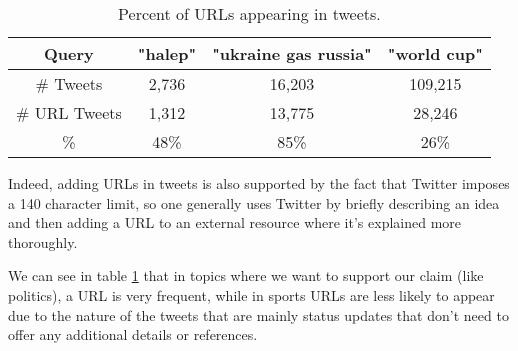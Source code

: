 \begin{table}[!h]
\centering
\setlength{\tabcolsep}{12pt}
\begin{tabular}{ | c | c | c| c | }
\hline
Query & "halep" & "ukraine gas russia" & "world cup"\\
\hline
\# Tweets & 2,736 & 16,203 & 109,215\\
\hline
\# URL Tweets & 1,312 & 13,775 & 28,246\\
\hline
\% & 48\% & 85\% & 26\% \\
\hline
\end{tabular}
\caption{Percent of URLs appearing in tweets.}
\label{table:url-percent}
\end{table}


Indeed, adding URLs in tweets is also supported by the fact that Twitter imposes a 140 character limit, so one generally uses Twitter by briefly describing an idea and then adding a URL to an external resource where it's explained more thoroughly.

We can see in table \ref{table:url-percent} that in topics where we want to support our claim (like politics), a URL is very frequent, while in sports URLs are less likely to appear due to the nature of the tweets that are mainly status updates that don't need to offer any additional details or references.
